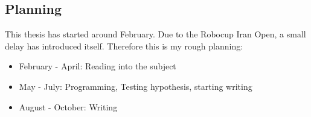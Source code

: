 \documentclass[a4paper,10pt]{article}
\begin{document}
\vspace{-.3cm}
\subsection*{Planning}
This thesis has started around February. Due to the Robocup Iran Open, a small
delay has introduced itself. Therefore this is my rough planning:
\begin{itemize}
	\item February - April: Reading into the subject
	\item May - July: Programming, Testing hypothesis, starting writing
	\item August - October: Writing
\end{itemize}
\vspace{-.5cm}


\end{document}
